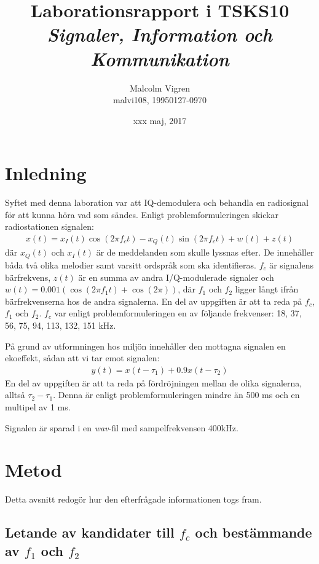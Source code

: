 \documentclass[10pt,twocolumn]{article}
\title{Laborationsrapport i TSKS10 \emph{Signaler, Information och Kommunikation}}
\author{Malcolm Vigren \\ malvi108, 19950127-0970 }
\date{xxx maj, 2017}
\begin{document}
\maketitle

\section{Inledning}

Syftet med denna laboration var att IQ-demodulera och behandla en radiosignal
för att kunna höra vad som sändes. Enligt problemformuleringen skickar
radiostationen signalen:
\begin{align*}
    x(t) = x_I(t)\cos(2 \pi f_c t) - x_Q(t)\sin(2 \pi f_c t) + w(t) + z(t)
\end{align*}
där $x_Q(t)$ och $x_I(t)$ är de meddelanden som skulle lyssnas efter. De
innehåller båda två olika melodier samt varsitt ordspråk som ska identifieras.
$f_c$ är signalens bärfrekvens, $z(t)$ är en summa av andra I/Q-modulerade
signaler och $w(t) = 0.001(\cos(2 \pi f_1 t) + \cos(2 \pi))$, där $f_1$ och
$f_2$ ligger långt ifrån bärfrekvenserna hos de andra signalerna. En del av
uppgiften är att ta reda på $f_c$, $f_1$ och $f_2$. $f_c$ var enligt
problemformuleringen en av följande frekvenser: 18, 37, 56, 75, 94, 113,
132, 151 kHz.

På grund av utformningen hos miljön innehåller den mottagna signalen en
ekoeffekt, sådan att vi tar emot signalen:
\begin{align*}
    y(t) = x(t - \tau_1) + 0.9x(t - \tau_2)
\end{align*}
En del av uppgiften är att ta reda på fördröjningen mellan de olika signalerna,
alltså $\tau_2 - \tau_1$. Denna är enligt problemformuleringen mindre än 500 ms
och en multipel av 1 ms.

Signalen är sparad i en \textit{wav}-fil med sampelfrekvensen 400kHz.

\section{Metod}

Detta avsnitt redogör hur den efterfrågade informationen togs fram.

\subsection{Letande av kandidater till $f_c$ och bestämmande av $f_1$ och
$f_2$}
\end{document}
